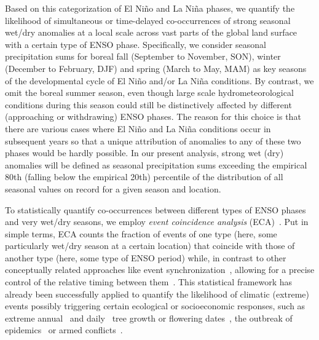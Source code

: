 \documentclass[utf8]{frontiersSCNS} %
\begin{document}
Based on this categorization of El Ni\~no and La Ni\~na phases, we quantify the likelihood of simultaneous or time-delayed co-occurrences of strong seasonal wet/dry anomalies at a local scale across vast parts of the global land surface with a certain type of ENSO phase. Specifically, we consider seasonal precipitation sums for boreal fall (September to November, SON), winter (December to February, DJF) and spring (March to May, MAM) as key seasons of the developmental cycle of El Ni{\~{n}}o and/or La Ni{\~{n}}a conditions. By contrast, we omit the boreal summer season, even though large scale hydrometeorological conditions during this season could still be distinctively affected by different (approaching or withdrawing) ENSO phases. The reason for this choice is that there are various cases where El Ni{\~{n}}o and La Ni{\~{n}}a conditions occur in subsequent years so that a unique attribution of anomalies to any of these two phases would be hardly possible. In our present analysis, strong wet (dry) anomalies will be defined as seasonal precipitation sums exceeding the empirical 80th (falling below the empirical 20th) percentile of the distribution of all seasonal values on record for a given season and location. 

To statistically quantify co-occurrences between different types of ENSO phases and very wet/dry seasons, we employ \textit{event coincidence analysis} (ECA)~\citep{donges_nonlinear_2011,Donges2016a}. Put in simple terms, ECA counts the fraction of events of one type (here, some particularly wet/dry season at a certain location) that coincide with those of another type (here, some type of ENSO period) while, in contrast to other conceptually related approaches like event synchronization~\citep{quian_quiroga_event_2002,boers2014prediction, malik2010spatial}, allowing for a precise control of the relative timing between them~\citep{wolf2020event}. This statistical framework has already been successfully applied to quantify the likelihood of climatic (extreme) events possibly triggering certain ecological or socioeconomic responses, such as extreme annual~\citep{rammig_coincidences_2015} and daily~\citep{Siegmund2016b} tree growth or flowering dates~\citep{Siegmund2016a}, the outbreak of epidemics~\citep{Donges2016a} or armed conflicts~\citep{Schleussner16082016,Ide2020}. 
\end{document}
